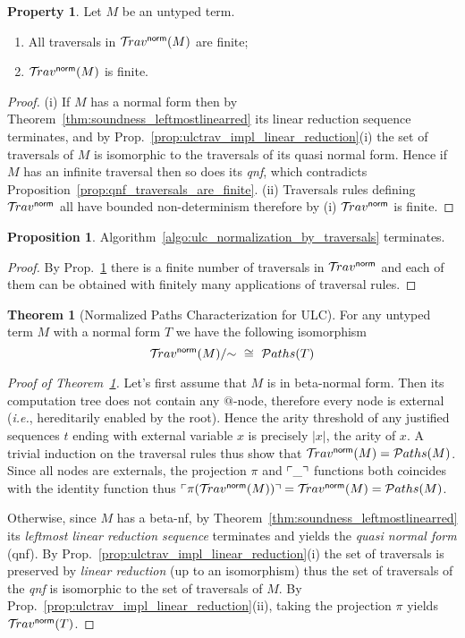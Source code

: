 \documentclass{article}
\makeatletter
\theoremstyle{definition}
\newtheorem{property}{Property}[section]
\newtheorem{proposition}{Proposition}[section]
\newtheorem{theorem}{Theorem}[section]
\newcommand{\normalizing}{{\sf norm}}
\newcommand{\travsetnorm}{\travset^\normalizing}
\def\coresymbol{\pi} %
\newcommand{\core}[1]{\coresymbol(#1)} %
\newcommand\pathset{{\mathcal{P}aths}} %
\renewcommand\ie{{\it i.e.\@\xspace}}
\makeatother
\begin{document}
\begin{property}
\label{prop:ulc_travnorm_finite}
Let $M$ be an untyped term.
\begin{enumerate}[label=(\roman*)]
\item All traversals in $\travsetnorm(M)$ are finite;
\item $\travsetnorm(M)$ is finite.
\end{enumerate}
\end{property}
\begin{proof}
(i) If $M$ has a normal form then by Theorem~\ref{thm:soundness_leftmostlinearred} its linear reduction sequence terminates, and by Prop.~\ref{prop:ulctrav_impl_linear_reduction}(i) the set of traversals of $M$ is isomorphic to the traversals of its quasi normal form. Hence if $M$ has an infinite traversal then so does its \emph{qnf}, which contradicts Proposition~\ref{prop:qnf_traversals_are_finite}.
(ii) Traversals rules defining $\travsetnorm$ all have bounded non-determinism therefore by (i) $\travsetnorm$ is finite.
\end{proof}


\begin{proposition}
Algorithm~\ref{algo:ulc_normalization_by_traversals} terminates.
\end{proposition}
\begin{proof}
By Prop.~\ref{prop:ulc_travnorm_finite} there is a finite number of traversals in $\travsetnorm$ and each of them can be obtained with finitely many applications of traversal rules.
\end{proof}

\begin{theorem}[Normalized Paths Characterization for ULC]
\label{thm:path_charact_ulc}
For any untyped term $M$ with a normal form $T$ we have the following isomorphism
$$\travsetnorm(M)/{\sim} \ \cong\ \pathset(T)$$
\end{theorem}
\begin{proof}[Proof of Theorem~\ref{thm:path_charact_ulc}]
Let's first assume that $M$ is in beta-normal form. Then its computation tree does not contain any $@$-node, therefore every node is external (\ie, hereditarily enabled by the root).
Hence the arity threshold of any justified sequences $t$ ending with external variable $x$ is precisely $|x|$, the arity of $x$. A trivial induction on the traversal rules thus show that $\travsetnorm(M) = \pathset(M)$. Since all nodes are externals, the projection $\coresymbol$ and $\ulcorner \_ \urcorner$ functions both coincides with the identity function thus $\pview{\core{\travsetnorm(M)}} = \travsetnorm(M) = \pathset(M)$.

Otherwise, since $M$ has a beta-nf, by Theorem~\ref{thm:soundness_leftmostlinearred} its \emph{leftmost linear reduction sequence} terminates and yields the \emph{quasi normal form} (qnf). By Prop.~\ref{prop:ulctrav_impl_linear_reduction}(i) the set of traversals is preserved by \emph{linear reduction} (up to an isomorphism) thus the set of traversals of the \emph{qnf} is isomorphic to the set of traversals of $M$. By Prop.~\ref{prop:ulctrav_impl_linear_reduction}(ii), taking the projection $\coresymbol$ yields $\travsetnorm(T)$.
\end{proof}
\end{document}
